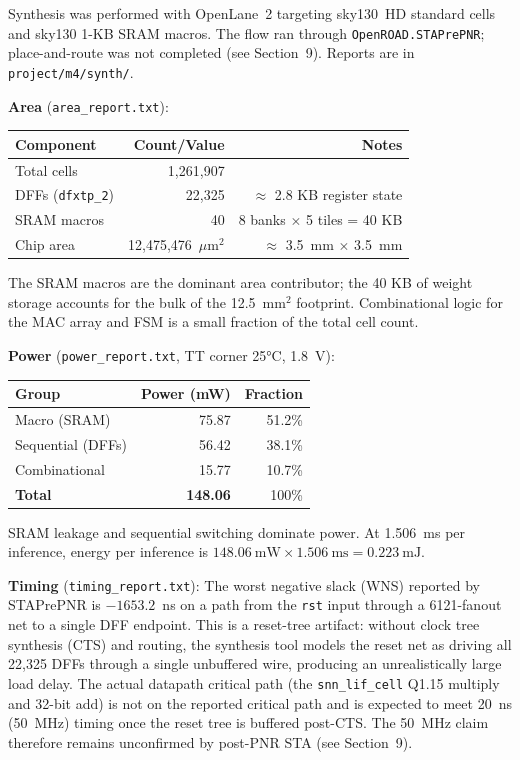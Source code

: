 \documentclass[11pt,letterpaper]{article}
\begin{document}
Synthesis was performed with OpenLane~2 targeting sky130~HD standard cells and
sky130 1-KB SRAM macros. The flow ran through \texttt{OpenROAD.STAPrePNR};
place-and-route was not completed (see Section~9). Reports are in
\texttt{project/m4/synth/}.

\textbf{Area} (\texttt{area\_report.txt}):
\begin{center}
\begin{tabular}{lrr}
\toprule
Component & Count/Value & Notes \\
\midrule
Total cells & 1,261,907 & \\
DFFs (\texttt{dfxtp\_2}) & 22,325 & $\approx$ 2.8 KB register state \\
SRAM macros & 40 & 8 banks $\times$ 5 tiles = 40 KB \\
Chip area & 12,475,476~$\mu$m$^2$ & $\approx$ 3.5~mm $\times$ 3.5~mm \\
\bottomrule
\end{tabular}
\end{center}
The SRAM macros are the dominant area contributor; the 40 KB of weight storage
accounts for the bulk of the 12.5~mm$^2$ footprint. Combinational logic for
the MAC array and FSM is a small fraction of the total cell count.

\textbf{Power} (\texttt{power\_report.txt}, TT corner 25°C, 1.8~V):
\begin{center}
\begin{tabular}{lrr}
\toprule
Group & Power (mW) & Fraction \\
\midrule
Macro (SRAM) & 75.87 & 51.2\% \\
Sequential (DFFs) & 56.42 & 38.1\% \\
Combinational & 15.77 & 10.7\% \\
\midrule
\textbf{Total} & \textbf{148.06} & 100\% \\
\bottomrule
\end{tabular}
\end{center}
SRAM leakage and sequential switching dominate power. At 1.506~ms per inference,
energy per inference is $148.06\ \text{mW} \times 1.506\ \text{ms} = 0.223\ \text{mJ}$.

\textbf{Timing} (\texttt{timing\_report.txt}):
The worst negative slack (WNS) reported by STAPrePNR is $-1653.2$~ns on a path
from the \texttt{rst} input through a 6121-fanout net to a single DFF
endpoint. This is a reset-tree artifact: without clock tree synthesis (CTS) and
routing, the synthesis tool models the reset net as driving all 22,325 DFFs
through a single unbuffered wire, producing an unrealistically large load delay.
The actual datapath critical path (the \texttt{snn\_lif\_cell} Q1.15 multiply
and 32-bit add) is not on the reported critical path and is expected to meet
20~ns (50~MHz) timing once the reset tree is buffered post-CTS. The 50~MHz
claim therefore remains unconfirmed by post-PNR STA (see Section~9).
\end{document}
